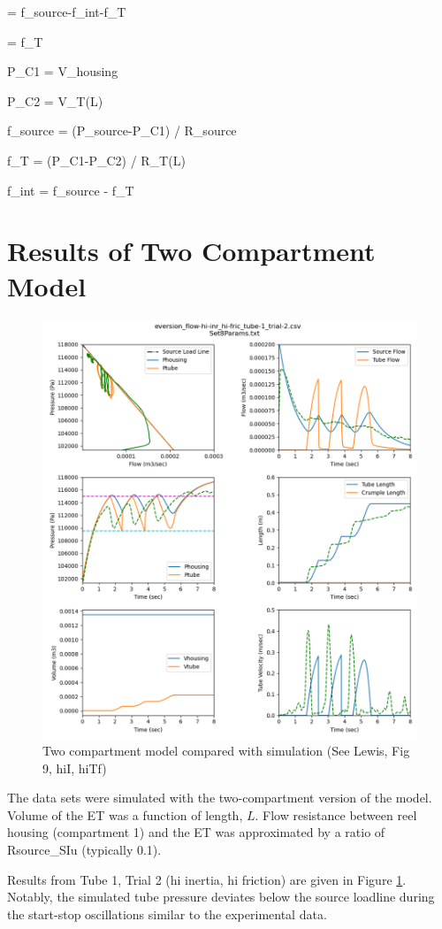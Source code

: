 \documentclass[letterpaper]{article}
\begin{document}
\beq
{} = f_{source}-f_{int}-f_T
\eeq

\beq
{} =  f_T
\eeq

\beq
P_{C1} =   {V_{housing}}
\eeq

\beq
P_{C2} =   {V_T(L)}
\eeq

\beq
f_{source} = (P_{source}-P_{C1}) /  R_{source}
\eeq

\beq
f_{T} = (P_{C1}-P_{C2}) /  R_{T}(L)
\eeq

\beq
f_{int} = f_{source} - f_T
\eeq

\section{Results of Two Compartment Model}

\begin{figure}[h]\centering
\includegraphics[width=.75\textwidth]{2CompSimulationSet8.png}
\caption{Two compartment model compared with simulation (See Lewis, Fig 9, hiI, hiTf)}
\label{Fig:2Comp}
\end{figure}


The data sets were simulated with the two-compartment version of the model.  Volume of the ET was
a function of length, $L$.  Flow resistance between reel housing (compartment 1) and
the ET was approximated by a ratio of Rsource\_SIu (typically 0.1).

Results from Tube 1, Trial 2 (hi inertia, hi friction) are given in Figure \ref{Fig:2Comp}.
Notably, the simulated tube pressure deviates below the source loadline during the start-stop
oscillations similar to the experimental data.

\end{document}
